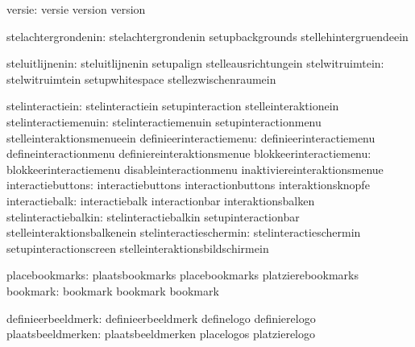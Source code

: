                        versie:  versie                       version
                                version

          stelachtergrondenin:  stelachtergrondenin          setupbackgrounds
                                stellehintergruendeein

              steluitlijnenin:  steluitlijnenin              setupalign
                                stelleausrichtungein
              stelwitruimtein:  stelwitruimtein              setupwhitespace
                                stellezwischenraumein

             stelinteractiein:  stelinteractiein             setupinteraction
                                stelleinteraktionein
         stelinteractiemenuin:  stelinteractiemenuin         setupinteractionmenu
                                stelleinteraktionsmenueein
      definieerinteractiemenu:  definieerinteractiemenu      defineinteractionmenu
                                definiereinteraktionsmenue
       blokkeerinteractiemenu:  blokkeerinteractiemenu       disableinteractionmenu
                                inaktiviereinteraktionsmenue
            interactiebuttons:  interactiebuttons            interactionbuttons
                                interaktionsknopfe
               interactiebalk:  interactiebalk               interactionbar
                                interaktionsbalken
         stelinteractiebalkin:  stelinteractiebalkin         setupinteractionbar
                                stelleinteraktionsbalkenein
       stelinteractieschermin:  stelinteractieschermin       setupinteractionscreen
                                stelleinteraktionsbildschirmein

               placebookmarks:  plaatsbookmarks              placebookmarks
                                platzierebookmarks
                     bookmark:  bookmark                     bookmark
                                bookmark

           definieerbeeldmerk:  definieerbeeldmerk           definelogo
                                definierelogo
            plaatsbeeldmerken:  plaatsbeeldmerken            placelogos
                                platzierelogo

